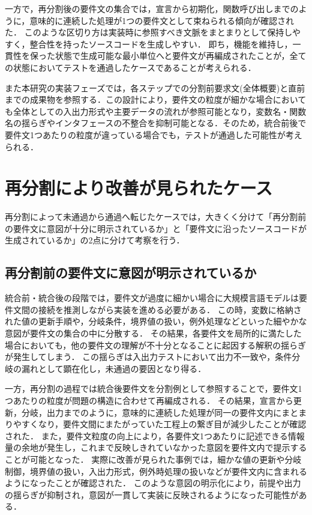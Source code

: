 \documentclass[11pt]{jreport}
\begin{document}
一方で，再分割後の要件文の集合では，宣言から初期化，関数呼び出しまでのように，意味的に連続した処理が1つの要件文として束ねられる傾向が確認された．
このような区切り方は実装時に参照すべき文脈をまとまりとして保持しやすく，整合性を持ったソースコードを生成しやすい．
即ち，機能を維持し，一貫性を保った状態で生成可能な最小単位へと要件文が再編成されたことが，全ての状態においてテストを通過したケースであることが考えられる．

また本研究の実装フェーズでは，各ステップでの分割前要求文(全体概要)と直前までの成果物を参照する．この設計により，要件文の粒度が細かな場合においても全体としての入出力形式や主要データの流れが参照可能となり，変数名・関数名の揺らぎやインタフェースの不整合を抑制可能となる．そのため，統合前後で要件文1つあたりの粒度が違っている場合でも，テストが通過した可能性が考えられる．


\section{再分割により改善が見られたケース}
再分割によって未通過から通過へ転じたケースでは，大きくく分けて「再分割前の要件文に意図が十分に明示されているか」と「要件文に沿ったソースコードが生成されているか」の2点に分けて考察を行う．

\subsection{再分割前の要件文に意図が明示されているか}
統合前・統合後の段階では，要件文が過度に細かい場合に大規模言語モデルは要件文間の接続を推測しながら実装を進める必要がある．
この時，変数に格納された値の更新手順や，分岐条件，境界値の扱い，例外処理などといった細やかな意図が要件文の集合の中に分散する．
その結果，各要件文を局所的に満たした場合においても，他の要件文の理解が不十分となることに起因する解釈の揺らぎが発生してしまう．
この揺らぎは入出力テストにおいて出力不一致や，条件分岐の漏れとして顕在化し，未通過の要因となり得る．

一方，再分割の過程では統合後要件文を分割例として参照することで，要件文1つあたりの粒度が問題の構造に合わせて再編成される．
その結果，宣言から更新，分岐，出力までのように，意味的に連続した処理が同一の要件文内にまとまりやすくなり，要件文間にまたがっていた工程上の繋ぎ目が減少したことが確認された．
また，要件文粒度の向上により，各要件文1つあたりに記述できる情報量の余地が発生し，これまで反映しきれていなかった意図を要件文内で提示することが可能となった．
実際に改善が見られた事例では，細かな値の更新や分岐制御，境界値の扱い，入出力形式，例外時処理の扱いなどが要件文内に含まれるようになったことが確認された．
このような意図の明示化により，前提や出力の揺らぎが抑制され，意図が一貫して実装に反映されるようになった可能性がある．
\end{document}
